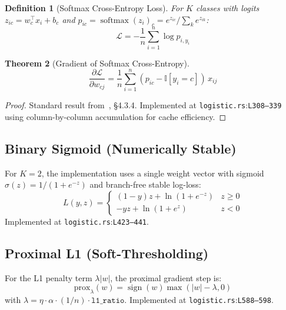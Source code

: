 \documentclass[11pt,a4paper]{article}
\newtheorem{theorem}{Theorem}[section]
\newtheorem{definition}[theorem]{Definition}
\theoremstyle{remark}
\newcommand{\coderef}[2]{\texttt{#1}:\texttt{L#2}}
\newcommand{\II}{\mathbb{I}}
\newcommand{\sign}{\operatorname{sign}}
\newcommand{\softmax}{\operatorname{softmax}}
\begin{document}
\begin{definition}[Softmax Cross-Entropy Loss]
For $K$ classes with logits $z_{ic} = w_c^\top x_i + b_c$ and
$p_{ic} = \softmax(z_i)_c = e^{z_{ic}} / \sum_k e^{z_{ik}}$:
\begin{equation}
  \mathcal{L} = -\frac{1}{n}\sum_{i=1}^{n} \log p_{i,y_i}
  \label{eq:xent}
\end{equation}
\end{definition}

\begin{theorem}[Gradient of Softmax Cross-Entropy]
\begin{equation}
  \frac{\partial \mathcal{L}}{\partial w_{cj}}
    = \frac{1}{n}\sum_{i=1}^{n} (p_{ic} - \II[y_i = c])\, x_{ij}
  \label{eq:xent-grad}
\end{equation}
\end{theorem}

\begin{proof}
Standard result from~\cite{bishop2006}, \S4.3.4.
Implemented at \coderef{logistic.rs}{308--339} using column-by-column
accumulation for cache efficiency. \checkmark
\end{proof}

\subsection{Binary Sigmoid (Numerically Stable)}

For $K = 2$, the implementation uses a single weight vector with
sigmoid $\sigma(z) = 1/(1+e^{-z})$ and branch-free stable log-loss:
\begin{equation}
  L(y, z) = \begin{cases}
    (1-y)z + \ln(1 + e^{-z}) & z \geq 0 \\
    -yz + \ln(1 + e^z) & z < 0
  \end{cases}
  \label{eq:stable-logsig}
\end{equation}
Implemented at \coderef{logistic.rs}{423--441}. \checkmark

\subsection{Proximal L1 (Soft-Thresholding)}

For the L1 penalty term $\lambda |w|$, the proximal gradient step is:
\begin{equation}
  \text{prox}_\lambda(w) = \sign(w) \max(|w| - \lambda, 0)
  \label{eq:prox-l1}
\end{equation}
with $\lambda = \eta \cdot \alpha \cdot (1/n) \cdot \texttt{l1\_ratio}$.
Implemented at \coderef{logistic.rs}{588--598}. \checkmark
\end{document}
